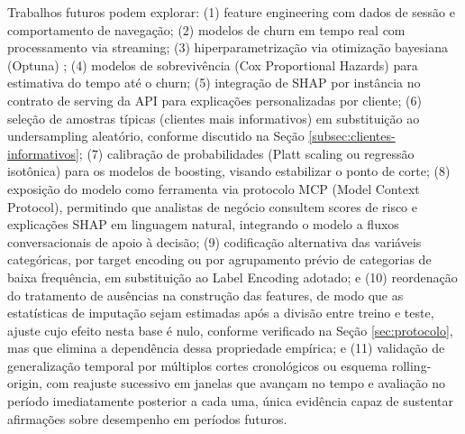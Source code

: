 Trabalhos futuros podem explorar: (1) feature engineering com dados de sessão e comportamento de navegação; (2) modelos de churn em tempo real com processamento via streaming; (3) hiperparametrização via otimização bayesiana (Optuna) \cite{imani2025}; (4) modelos de sobrevivência (Cox Proportional Hazards) para estimativa do tempo até o churn; (5) integração de SHAP por instância no contrato de serving da API para explicações personalizadas por cliente; (6) seleção de amostras típicas (clientes mais informativos) em substituição ao undersampling aleatório, conforme discutido na Seção \ref{subsec:clientes-informativos}; (7) calibração de probabilidades (Platt scaling ou regressão isotônica) para os modelos de boosting, visando estabilizar o ponto de corte; (8) exposição do modelo como ferramenta via protocolo MCP (Model Context Protocol), permitindo que analistas de negócio consultem scores de risco e explicações SHAP em linguagem natural, integrando o modelo a fluxos conversacionais de apoio à decisão; (9) codificação alternativa das variáveis categóricas, por target encoding ou por agrupamento prévio de categorias de baixa frequência, em substituição ao Label Encoding adotado; e (10) reordenação do tratamento de ausências na construção das features, de modo que as estatísticas de imputação sejam estimadas após a divisão entre treino e teste, ajuste cujo efeito nesta base é nulo, conforme verificado na Seção \ref{sec:protocolo}, mas que elimina a dependência dessa propriedade empírica; e (11) validação de generalização temporal por múltiplos cortes cronológicos ou esquema rolling-origin, com reajuste sucessivo em janelas que avançam no tempo e avaliação no período imediatamente posterior a cada uma, única evidência capaz de sustentar afirmações sobre desempenho em períodos futuros.
